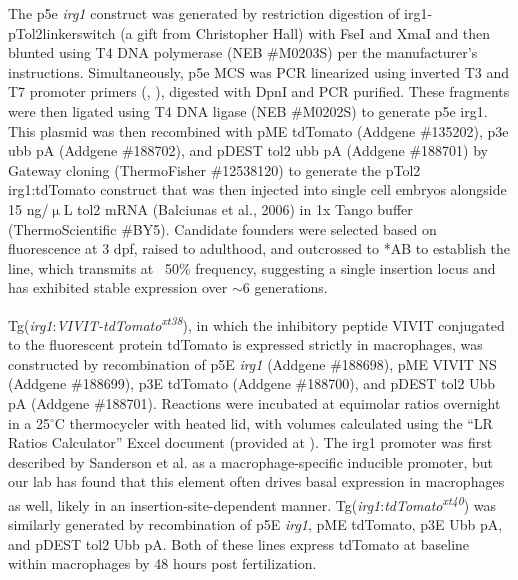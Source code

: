 The p5e \textit{irg1} construct was generated by restriction digestion of irg1-pTol2linkerswitch \citep{Sanderson2015} (a gift from Christopher Hall) with FseI and XmaI and then blunted using T4 DNA polymerase (NEB \#M0203S) per the manufacturer's instructions. Simultaneously, p5e MCS \citep{Kwan2007} was PCR linearized using inverted T3 and T7 promoter primers (, ), digested with DpnI and PCR purified. These fragments were then ligated using T4 DNA ligase (NEB \#M0202S) to generate p5e irg1. This plasmid was then recombined with pME tdTomato (Addgene \#135202), p3e ubb pA (Addgene \#188702), and pDEST tol2 ubb pA (Addgene \#188701) by Gateway cloning (ThermoFisher \#12538120) to generate the pTol2 irg1:tdTomato construct that was then injected into single cell embryos alongside 15 ng/$\upmu$L tol2 mRNA (Balciunas et al., 2006) in 1x Tango buffer (ThermoScientific \#BY5). Candidate founders were selected based on fluorescence at 3 dpf, raised to adulthood, and outcrossed to *AB to establish the line, which transmits at ~50\% frequency, suggesting a single insertion locus and has exhibited stable expression over ${\sim}$6 generations.

Tg(\textit{irg1}:\textit{VIVIT-tdTomato\textsuperscript{xt38}}), in which the inhibitory peptide VIVIT conjugated to the fluorescent protein tdTomato is expressed strictly in macrophages, was constructed by recombination of p5E \textit{irg1} (Addgene \#188698), pME VIVIT NS (Addgene \#188699), p3E tdTomato (Addgene \#188700), and pDEST tol2 Ubb pA (Addgene \#188701). Reactions were incubated at equimolar ratios overnight in a 25$^{\circ}$C thermocycler with heated lid, with volumes calculated using the ``LR Ratios Calculator'' Excel document (provided at \citet{NFATZenodo}). The irg1 promoter was first described by Sanderson et al. as a macrophage-specific inducible promoter, but our lab has found that this element often drives basal expression in macrophages as well, likely in an insertion-site-dependent manner. Tg(\textit{irg1}:\textit{tdTomato\textsuperscript{xt40}}) was similarly generated by recombination of p5E \textit{irg1}, pME tdTomato, p3E Ubb pA, and pDEST tol2 Ubb pA. Both of these lines express tdTomato at baseline within macrophages by 48 hours post fertilization.

